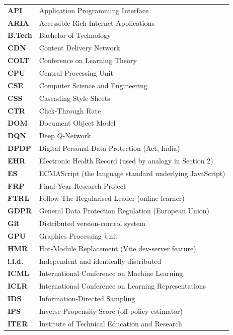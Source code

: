 \begin{xltabular}{\linewidth}{@{}p{3.5cm} X@{}}
\textbf{API}        & Application Programming Interface\\
\textbf{ARIA}       & Accessible Rich Internet Applications\\
\textbf{B.Tech}     & Bachelor of Technology\\
\textbf{CDN}        & Content Delivery Network\\
\textbf{COLT}       & Conference on Learning Theory\\
\textbf{CPU}        & Central Processing Unit\\
\textbf{CSE}        & Computer Science and Engineering\\
\textbf{CSS}        & Cascading Style Sheets\\
\textbf{CTR}        & Click-Through Rate\\
\textbf{DOM}        & Document Object Model\\
\textbf{DQN}        & Deep $Q$-Network\\
\textbf{DPDP}       & Digital Personal Data Protection (Act, India)\\
\textbf{EHR}        & Electronic Health Record (used by analogy in Section 2)\\
\textbf{ES}         & ECMAScript (the language standard underlying JavaScript)\\
\textbf{FRP}        & Final-Year Research Project\\
\textbf{FTRL}       & Follow-The-Regularised-Leader (online learner)\\
\textbf{GDPR}       & General Data Protection Regulation (European Union)\\
\textbf{Git}        & Distributed version-control system\\
\textbf{GPU}        & Graphics Processing Unit\\
\textbf{HMR}        & Hot-Module Replacement (Vite dev-server feature)\\
\textbf{i.i.d.}     & Independent and identically distributed\\
\textbf{ICML}       & International Conference on Machine Learning\\
\textbf{ICLR}       & International Conference on Learning Representations\\
\textbf{IDS}        & Information-Directed Sampling\\
\textbf{IPS}        & Inverse-Propensity-Score (off-policy estimator)\\
\textbf{ITER}       & Institute of Technical Education and Research\\

\end{xltabular}
